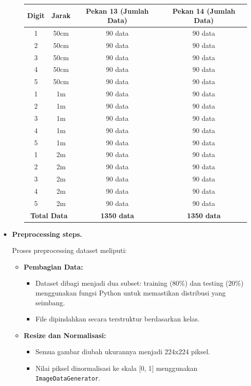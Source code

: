 \documentclass[12pt,a4paper]{article}
\begin{document}
\begin{itemize}
\begin{itemize}
\begin{tabular}{|c|c|c|c|}
\hline
\textbf{Digit} & \textbf{Jarak} & \textbf{Pekan 13 (Jumlah Data)} & \textbf{Pekan 14 (Jumlah Data)} \\ \hline
1 & 50cm & 90 data & 90 data \\ \hline
2 & 50cm & 90 data & 90 data \\ \hline
3 & 50cm & 90 data & 90 data \\ \hline
4 & 50cm & 90 data & 90 data \\ \hline
5 & 50cm & 90 data & 90 data \\ \hline
1 & 1m & 90 data & 90 data \\ \hline
2 & 1m & 90 data & 90 data \\ \hline
3 & 1m & 90 data & 90 data \\ \hline
4 & 1m & 90 data & 90 data \\ \hline
5 & 1m & 90 data & 90 data \\ \hline
1 & 2m & 90 data & 90 data \\ \hline
2 & 2m & 90 data & 90 data \\ \hline
3 & 2m & 90 data & 90 data \\ \hline
4 & 2m & 90 data & 90 data \\ \hline
5 & 2m & 90 data & 90 data \\ \hline
\multicolumn{2}{|c|}{\textbf{Total Data}} & \textbf{1350 data} & \textbf{1350 data} \\ \hline
\end{tabular}
    
\end{itemize}

    \item  \textbf {Preprocessing steps.}
    
    Proses preprocessing dataset meliputi:

    \begin{itemize}
    \item \textbf{Pembagian Data:} 
    \begin{itemize}
        \item Dataset dibagi menjadi dua subset: training (80\%) dan testing (20\%) menggunakan fungsi Python untuk memastikan distribusi yang seimbang.
        \item File dipindahkan secara terstruktur berdasarkan kelas.
    \end{itemize}

    \item \textbf{Resize dan Normalisasi:} 
    \begin{itemize}
        \item Semua gambar diubah ukurannya menjadi 224x224 piksel.
        \item Nilai piksel dinormalisasi ke skala [0, 1] menggunakan \texttt {ImageDataGenerator}.
    \end{itemize}


\end{itemize}
\end{itemize}
\end{document}
